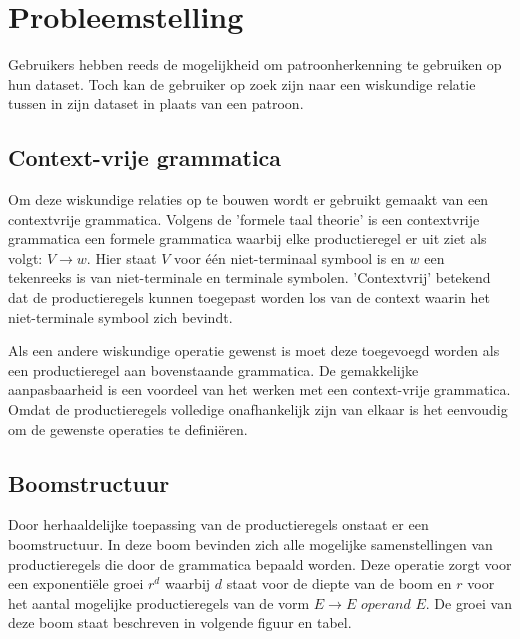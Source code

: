 \documentclass[Main.tex]{subfiles}
\begin{document}
\section{Probleemstelling}
Gebruikers hebben reeds de mogelijkheid om patroonherkenning te gebruiken op hun dataset. Toch kan de gebruiker op zoek zijn naar een wiskundige relatie tussen in zijn dataset in plaats van een patroon.
\subsection{Context-vrije grammatica}
Om deze wiskundige relaties op te bouwen wordt er gebruikt gemaakt van een contextvrije grammatica. Volgens de 'formele taal theorie' is een contextvrije grammatica een formele grammatica waarbij elke productieregel er uit ziet als volgt: $V \rightarrow w$. Hier staat $V$  voor \'e\'en niet-terminaal symbool is en $w$ een tekenreeks is van niet-terminale en terminale symbolen. 'Contextvrij' betekend dat de productieregels kunnen toegepast worden los van de context waarin het niet-terminale symbool zich bevindt. \\

\begin{center}
\end{center} 

Als een andere wiskundige operatie gewenst is moet deze toegevoegd worden als een productieregel aan bovenstaande grammatica. De gemakkelijke aanpasbaarheid is een voordeel van het werken met een context-vrije grammatica. Omdat de productieregels volledige onafhankelijk zijn van elkaar is het eenvoudig om de gewenste operaties te defini\"eren.

\subsection{Boomstructuur}

Door herhaaldelijke toepassing van de productieregels onstaat er een boomstructuur. In deze boom bevinden zich alle mogelijke samenstellingen van productieregels die door de grammatica bepaald worden. Deze operatie zorgt voor een exponenti\"ele groei $r^{d}$ waarbij $d$ staat voor de diepte van de boom en $r$ voor het aantal mogelijke productieregels van de vorm $E \rightarrow E$  $operand$ $ E$. De groei van deze boom staat beschreven in volgende figuur en tabel. %
\end{document}
